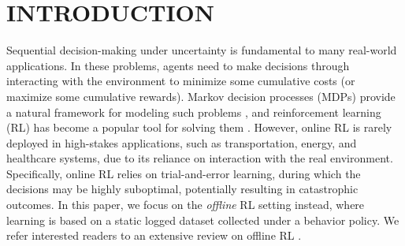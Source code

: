 \documentclass[letterpaper, 10 pt, conference]{ieeeconf}  %
\begin{document}
\section{INTRODUCTION}
Sequential decision-making under uncertainty is fundamental to many real-world applications. In these problems, agents need to make decisions through interacting with the environment to minimize some cumulative costs (or maximize some cumulative rewards). Markov decision processes (MDPs) provide a natural framework for modeling such problems \cite{puterman2014markov}, and reinforcement learning (RL) has become a popular tool for solving them \cite{sutton2018reinforcement}. However, online RL is rarely deployed in high-stakes applications, such as transportation, energy, and healthcare systems, due to its reliance on interaction with the real environment. Specifically, online RL relies on trial-and-error learning, during which the decisions may be highly suboptimal, potentially resulting in catastrophic outcomes. In this paper, we focus on the \textit{offline} RL setting instead, where learning is based on a static logged dataset collected under a behavior policy. We refer interested readers to an extensive review on offline RL \cite{levine2020offline}.
\end{document}
